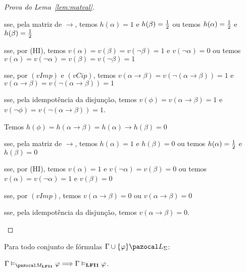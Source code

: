 \begin{proof}[Prova do Lema~\ref{lem:matval}]
\begin{provaporcasos}
\begin{provaporsubcasos}
                    \qquad{}sse, pela matriz de $\to$, temos $h(\alpha) = 1$ e $h(\beta) = \frac{1}{2}{}$ ou temos $h(\alpha) = \frac{1}{2}{}$ e $h(\beta) = \frac{1}{2}{}$

                    \qquad{}sse, por (HI), temos $v(\alpha) = v(\beta) = v(\neg \beta) = 1$ e $v(\neg \alpha) = 0$ ou temos $v(\alpha) = v(\neg \alpha) = v(\beta) = v(\neg \beta) = 1$

                    \qquad{}sse, por $(vImp)$ e $(vCip)$, temos $v(\alpha \to \beta) = v(\neg (\alpha \to \beta)) = 1$ e $v(\alpha \to \beta) = v(\neg (\alpha \to \beta)) = 1$

                    \qquad{}sse, pela idempotência da disjunção, temos $v(\phi) = v(\alpha \to \beta) = 1$ e $v(\neg \phi) = v(\neg (\alpha \to \beta)) = 1$.


                    Temos $h(\phi) = h(\alpha \to \beta) = h(\alpha) \to h(\beta) = 0$

                    \qquad{}sse, pela matriz de $\to$, temos $h(\alpha) = 1$ e $h(\beta) = 0$ ou temos $h(\alpha) = \frac{1}{2}{}$ e $h(\beta) = 0$

                    \qquad{}sse, por (HI), temos $v(\alpha) = 1$ e $v(\neg \alpha) = v(\beta) = 0$ ou temos $v(\alpha) = v(\neg \alpha) = 1$ e $v(\beta) = 0$

                    \qquad{}sse, por $(vImp)$, temos $v(\alpha \to \beta) = 0$ ou $v(\alpha \to \beta) = 0$

                    \qquad{}sse, pela idempotência da disjunção, temos $v(\alpha \to \beta) = 0$.
            \end{provaporsubcasos}
        \end{provaporcasos}
    \end{proof}

    \begin{corolario}\label{cor:matval}
        Para todo conjunto de fórmulas $\Gamma \cup \{\phi\} \ling{}$:

        \centering
        $\Gamma \conmat \phi \Longrightarrow \Gamma \conval \phi$. 
    \end{corolario}

